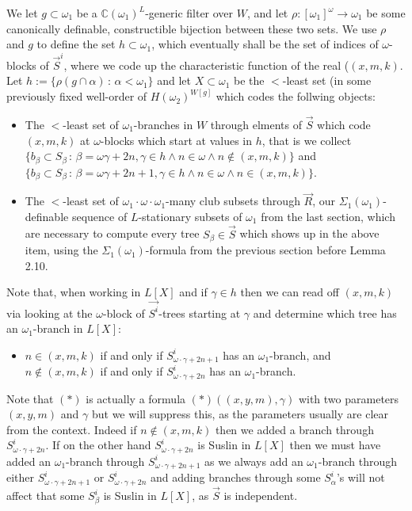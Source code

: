\documentclass[a4paper,11pt]{article}
\begin{document}
We let $g \subset \omega_1$ be a $\mathbb{C} (\omega_1)^L$-generic filter over $W$, and let $\rho: [\omega_1]^{\omega} \rightarrow \omega_1$ be some canonically definable, constructible bijection between
these two sets. We use $\rho$ and $g$ to define the set $h \subset \omega_1$, which eventually shall be the set of indices of $\omega$-blocks of $\vec{S}^i$, where we code up the characteristic function of the real ($(x,m,k)$. Let $h:= \{\rho( g \cap \alpha) \,: \, \alpha < \omega_1 \}$ and let $X \subset \omega_1$ be the $<$-least set  (in some previously fixed well-order of $H(\omega_2)^{W[g]}$ which codes the follwing objects:
\begin{itemize}
\item The $<$-least set of $\omega_1$-branches in $W$ through elments of $\vec{S}$ which code $(x,m,k)$ at $\omega$-blocks which start at values in $h$, that is  we collect $\{ b_{\beta} \subset S_{\beta} \, : \, \beta= \omega \gamma + 2n, \gamma \in h \land n \in \omega \land n \notin (x,m,k) \}$ and  $\{ b_{\beta} \subset S_{\beta} \, : \, \beta= \omega \gamma + 2n+1, \gamma \in h \land n \in \omega \land n \in (x,m,k) \}$.
\item The $<$-least set of $\omega_1 \cdot \omega \cdot \omega_1$-many club subsets through $\vec{R}$, our $\Sigma_1 (\omega_1)$-definable sequence of $L$-stationary subsets of $\omega_1$ from the last section, which are necessary to compute every tree $S_{\beta} \in \vec{S}$ which shows up in the above item, using the $\Sigma_1 (\omega_1)$-formula from the previous section before Lemma 2.10.
\end{itemize}

Note that, when working in $L[X]$ and if $\gamma \in h$ then
 we can read off $(x,m,k)$ via looking at the $\omega$-block of $\vec{S^i}$-trees starting at $\gamma$ and determine which tree has an $\omega_1$-branch in $L[X]$:
\begin{itemize}
 \item[$(\ast)$]  $n \in (x,m,k)$ if and only if $S^i_{\omega \cdot \gamma +2n+1}$ has an $\omega_1$-branch, and $n \notin (x,m,k)$ if and only if $S^i_{\omega \cdot \gamma +2n}$ has an $\omega_1$-branch.
\end{itemize}
Note that $(\ast)$ is actually a formula $(\ast) ((x,y,m) ,\gamma)$ with two parameters $(x,y,m)$ and $\gamma$ but we will suppress this, as the parameters usually are clear from the context.
Indeed if $n \notin (x,m,k)$ then we added a branch through $S^i_{\omega \cdot \gamma+ 2n}$. If on the other hand $S^i_{\omega \cdot\gamma +2n}$ is 
Suslin in $L[X]$ then we must have added an $\omega_1$-branch through $S^i_{\omega \cdot \gamma +2n+1}$ as we always add an $\omega_1$-branch through either $S^i_{\omega \cdot \gamma +2n+1}$ or $S^i_{\omega \cdot \gamma +2n}$ and adding branches through some $S^i_{\alpha}$'s  will not affect that some $S^i_{\beta}$ is Suslin in $L[X]$, as $\vec{S}$ is independent.
\end{document}
